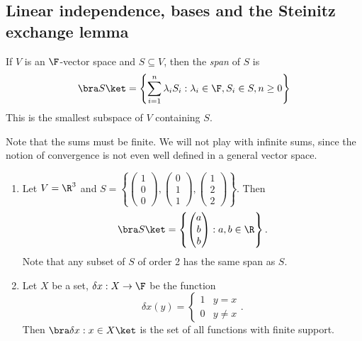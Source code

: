 \documentclass[a4paper]{article}
\begin{document}
\subsection{Linear independence, bases and the Steinitz exchange lemma}

\begin{defi}[Span]
  If $V$ is an $\F$-vector space and $S\subseteq V$, then the \emph{span} of $S$ is
  \[
    \bra S\ket = \left\{\sum_{i = 1}^n \lambda_i S_i : \lambda_i \in \F, S_i \in S, n \geq 0\right\}
  \]
  This is the smallest subspace of $V$ containing $S$.

  Note that the sums must be finite. We will not play with infinite sums, since the notion of convergence is not even well defined in a general vector space.
\end{defi}

\begin{eg}\leavevmode
  \begin{enumerate}
    \item Let $V = \R^3$ and $S = \left\{\begin{pmatrix}1\\0\\0\end{pmatrix}, \begin{pmatrix}0\\1\\1\end{pmatrix}, \begin{pmatrix}1\\2\\2\end{pmatrix}\right\}$. Then
      \[
        \bra S\ket = \left\{
          \begin{pmatrix}
            a\\b\\b\\
          \end{pmatrix}: a, b\in \R
        \right\}.
      \]
      Note that any subset of $S$ of order 2 has the same span as $S$.
    \item Let $X$ be a set, $\delta x: X\to \F$ be the function
      \[
        \delta x(y) =
        \begin{cases}
          1 & y = x\\
          0 & y\not= x
        \end{cases}.
      \]
      Then $\bra \delta x: x \in X\ket$ is the set of all functions with finite support.
  \end{enumerate}
\end{eg}
\end{document}
